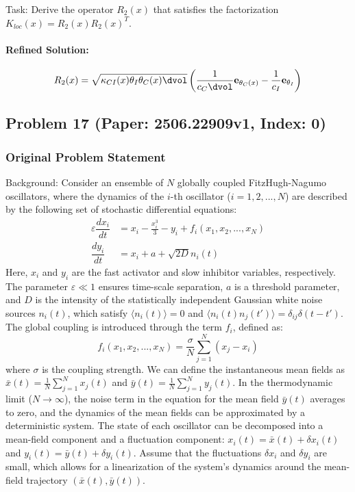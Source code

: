 \documentclass[10pt]{article}
\begin{document}
Task:
Derive the operator $R_2(x)$ that satisfies the factorization $K_{loc}(x) = R_2(x) R_2(x)^T$.

\paragraph*{Refined Solution:}
\[ R_{2}(x) = \sqrt{\kappa_{CI}(x)\theta_I\theta_C(x)\dvol} \left( \frac{1}{c_{C}\dvol} \mathbf{e}_{\theta_C(x)} - \frac{1}{c_{I}} \mathbf{e}_{\theta_I} \right) \]

\newpage
\subsection*{Problem 17 (Paper: 2506.22909v1, Index: 0)}

\subsubsection*{Original Problem Statement}
Background:
Consider an ensemble of $N$ globally coupled FitzHugh-Nagumo oscillators, where the dynamics of the $i$-th oscillator ($i=1, 2, ..., N$) are described by the following set of stochastic differential equations:
\begin{align*}
\varepsilon\dfrac{dx_{i}}{dt} &= x_i - \frac{x_i^3}{3} - y_i + f_i(x_1, x_2, ..., x_N) \\
\dfrac{dy_i}{dt} &= x_i + a + \sqrt{2D}n_i(t)
\end{align*}
Here, $x_i$ and $y_i$ are the fast activator and slow inhibitor variables, respectively. The parameter $\varepsilon \ll 1$ ensures time-scale separation, $a$ is a threshold parameter, and $D$ is the intensity of the statistically independent Gaussian white noise sources $n_i(t)$, which satisfy $\langle n_i(t) \rangle = 0$ and $\langle n_i(t)n_j(t') \rangle = \delta_{ij}\delta(t-t')$. The global coupling is introduced through the term $f_i$, defined as:
$$ f_i(x_1, x_2, ..., x_N) = \frac{\sigma}{N} \sum_{j=1}^{N}(x_j - x_i) $$
where $\sigma$ is the coupling strength. We can define the instantaneous mean fields as $\bar{x}(t) = \frac{1}{N}\sum_{j=1}^{N}x_j(t)$ and $\bar{y}(t) = \frac{1}{N}\sum_{j=1}^{N}y_j(t)$. In the thermodynamic limit ($N \to \infty$), the noise term in the equation for the mean field $\bar{y}(t)$ averages to zero, and the dynamics of the mean fields can be approximated by a deterministic system. The state of each oscillator can be decomposed into a mean-field component and a fluctuation component: $x_i(t) = \bar{x}(t) + \delta x_i(t)$ and $y_i(t) = \bar{y}(t) + \delta y_i(t)$. Assume that the fluctuations $\delta x_i$ and $\delta y_i$ are small, which allows for a linearization of the system's dynamics around the mean-field trajectory $(\bar{x}(t), \bar{y}(t))$.
\end{document}
